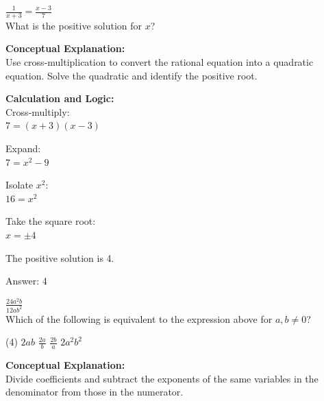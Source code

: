 \documentclass[11pt,paper=a4,answers]{exam}
\begin{document}
\begin{questions}
\vspace{40pt}

\question
$\frac{1}{x+3} = \frac{x-3}{7}$ \\
What is the positive solution for $x$?

\begin{solution}
\textbf{Conceptual Explanation:} \\
Use cross-multiplication to convert the rational equation into a quadratic equation. Solve the quadratic and identify the positive root.

\vspace{20pt}

\textbf{Calculation and Logic:} \\
Cross-multiply: \\
$7 = (x+3)(x-3)$

\vspace{10pt}

Expand: \\
$7 = x^2 - 9$

\vspace{10pt}

Isolate $x^2$: \\
$16 = x^2$

\vspace{10pt}

Take the square root: \\
$x = \pm 4$

\vspace{10pt}

The positive solution is 4.

\vspace{25pt}

Answer: \colorbox{yellow!100}{4}
\end{solution}

\vspace{40pt}

\question
$\frac{24a^2 b}{12ab^2}$ \\
Which of the following is equivalent to the expression above for $a, b \neq 0$?
\begin{tasks}(4)
    \task $2ab$
    \task $\frac{2a}{b}$
    \task $\frac{2b}{a}$
    \task $2a^2b^2$
\end{tasks}

\begin{solution}
\textbf{Conceptual Explanation:} \\
Divide coefficients and subtract the exponents of the same variables in the denominator from those in the numerator.


\end{solution}
\end{questions}
\end{document}
